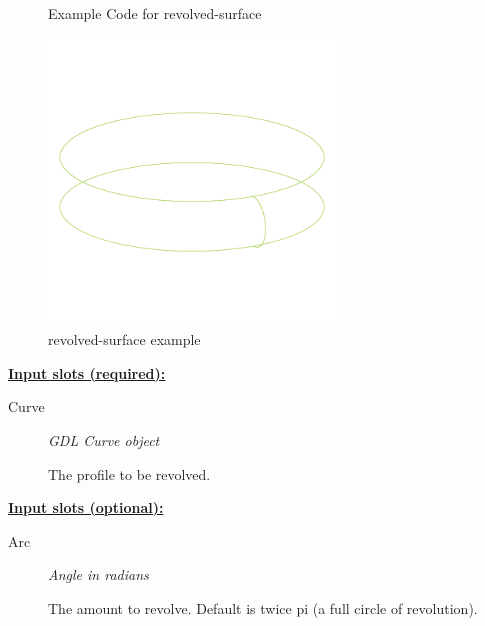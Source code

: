 \documentclass [11pt]{book}
\begin{document}
\begin{itemize}
\begin{figure}
\caption{Example Code for revolved-surface}

\label{fig:example-code-revolved-surface}

\end{figure}

\begin{figure}
\begin{center}
\includegraphics[width=3in,height=3in]{../images/example-revolved-surface.pdf}
\end{center}

\caption{revolved-surface example}

\label{fig:revolved-surface}

\end{figure}





\textbf{
\underline{Input slots (required):}}

\begin{description}

\item [Curve]
\emph{GDL Curve object}

 The profile to be revolved.




\end{description}






\textbf{
\underline{Input slots (optional):}}

\begin{description}

\item [Arc]
\emph{Angle in radians}

 The amount to revolve. Default is twice pi (a full circle of revolution).





\end{description}
\end{itemize}
\end{document}
